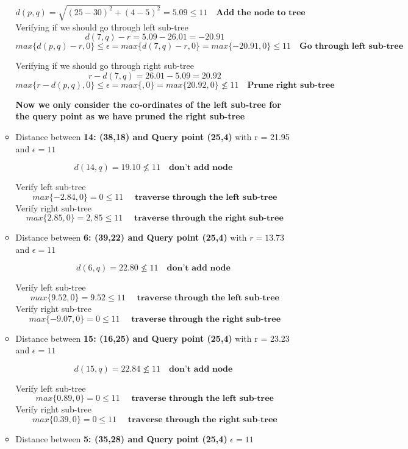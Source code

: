 \begin{enumerate}
\begin{itemize}
\[ d(p,q) = \sqrt{(25-30)^2+{(4-5)^2}} = 5.09 \le 11 \quad \textbf{Add the node to tree} \] 
    Verifying if we should go through left sub-tree
    \[d(7,q)-r = 5.09-26.01 = -20.91 \]
    \[ {max\{d(p,q)-r,0\} \le \epsilon} = {max\{d(7,q)-r,0\} = max\{-20.91,0\}} \le 11 \quad \textbf{Go through left sub-tree} \]
    
    Verifying if we should go through right sub-tree
     \[r-d(7,q) = 26.01-5.09 = 20.92 \]
    \[ {max\{r-d(p,q),0\}  \le \epsilon } = {max\{,0\} = max\{20.92,0\}} \nleq 11 \quad  \textbf{Prune right sub-tree}\] 

    \textbf{Now we only consider the co-ordinates of the left sub-tree for the query point as we have pruned the right sub-tree}
\\
    
    \item Distance between \textbf{14: (38,18) and Query point (25,4)} with r = 21.95 and $\epsilon = 11$


    \[ d(14,q)= 19.10 \nleq 11 \quad \textbf{don't add node } \]

    Verify left sub-tree \[ max\{-2.84,0\} = 0 \le 11 \quad \textbf{ traverse through the left sub-tree}\]
    Verify right sub-tree \[ max\{2.85,0\} = 2,85 \le 11 \quad \textbf{ traverse through the right sub-tree}\]

    \item Distance between \textbf{6: (39,22) and Query point (25,4)} with $r = 13.73$ and $\epsilon = 11$

     \[ d(6,q)= 22.80 \nleq 11 \quad \textbf{don't add node } \]
     
    Verify left sub-tree \[ max\{9.52,0\} = 9.52 \le 11 \quad \textbf{ traverse through the left sub-tree}\]
    Verify right sub-tree \[ max\{-9.07,0\} = 0 \le 11 \quad \textbf{ traverse through the right sub-tree}\]

    \item Distance between \textbf{15: (16,25) and Query point (25,4)} with r = 23.23 and $\epsilon = 11$

     \[ d(15,q)= 22.84 \nleq 11 \quad \textbf{don't add node } \]
     
    Verify left sub-tree \[ max\{0.89,0\} = 0 \le 11 \quad \textbf{ traverse through the left sub-tree}\]
    Verify right sub-tree \[ max\{0.39,0\} = 0 \le 11 \quad \textbf{ traverse through the right sub-tree}\]

    \item Distance between \textbf{5: (35,28) and Query point (25,4)} $\epsilon = 11$


\end{itemize}
\end{enumerate}
